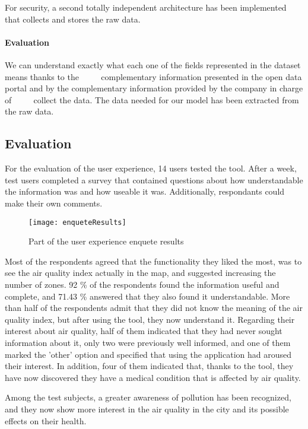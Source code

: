For security, a second totally independent architecture has been implemented that collects and stores the raw data.

\paragraph{Evaluation} \mbox{} 

\begin{itemize}
    \done We can understand exactly what each one of the fields represented in the dataset means thanks to the 
         complementary information presented in the open data portal and by the complementary information provided by the company in charge of
         collect the data.
    \done The data needed for our model has been extracted from the raw data.
\end{itemize}

\subsection*{Evaluation}
For the evaluation of the user experience, 14 users tested the tool.
After a week, test users completed a survey that contained questions about how understandable the information was
and how useable it was. Additionally, respondants could make their own comments.
\begin{figure}[ht]
   \centering
   \texttt{[image: enqueteResults]}
   \caption{Part of the user experience enquete results}
\end{figure}

Most of the respondents agreed that the functionality they liked the most, was to see the air quality index actually in the
map, and suggested increasing the number of zones.
92 \% of the respondents found the information useful and complete, and 71.43 \% answered that they also found it
understandable.
More than half of the respondents admit that they did not know the meaning of the air quality index, but after
using the tool, they now understand it.
Regarding their interest about air quality, half of them indicated that they had never sought information about it,
only two were previously well informed, and one of them marked the 'other' option and specified that using the application had aroused their interest.
In addition, four of them indicated that, thanks to the tool, they have now discovered they have a medical condition that is affected by air quality.

Among the test subjects, a greater awareness of pollution has been recognized, and they now show more interest in the
air quality in the city and its possible effects on their health.

